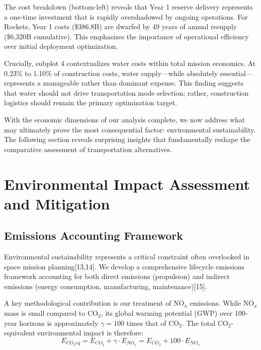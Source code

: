 \documentclass[12pt]{article}
\begin{document}
	The cost breakdown (bottom-left) reveals that Year 1 reserve delivery represents a one-time investment that is rapidly overshadowed by ongoing operations. For Rockets, Year 1 costs (\$386.8B) are dwarfed by 49 years of annual resupply (\$6,320B cumulative). This emphasizes the importance of operational efficiency over initial deployment optimization.
	
	Crucially, subplot 4 contextualizes water costs within total mission economics. At 0.23\% to 1.10\% of construction costs, water supply---while absolutely essential---represents a manageable rather than dominant expense. This finding suggests that water should not drive transportation mode selection; rather, construction logistics should remain the primary optimization target.
	
	With the economic dimensions of our analysis complete, we now address what may ultimately prove the most consequential factor: environmental sustainability. The following section reveals surprising insights that fundamentally reshape the comparative assessment of transportation alternatives.
	
	\section{Environmental Impact Assessment and Mitigation}
	
	\subsection{Emissions Accounting Framework}
	
	Environmental sustainability represents a critical constraint often overlooked in space mission planning[13,14]. We develop a comprehensive lifecycle emissions framework accounting for both direct emissions (propulsion) and indirect emissions (energy consumption, manufacturing, maintenance)[15].
	
	A key methodological contribution is our treatment of NO$_x$ emissions. While NO$_x$ mass is small compared to CO$_2$, its global warming potential (GWP) over 100-year horizons is approximately $\gamma = 100$ times that of CO$_2$. The total CO$_2$-equivalent environmental impact is therefore:
	\begin{equation}
		E_{CO_2eq} = E_{CO_2} + \gamma \cdot E_{NO_x} = E_{CO_2} + 100 \cdot E_{NO_x}
	\end{equation}
	
\end{document}
